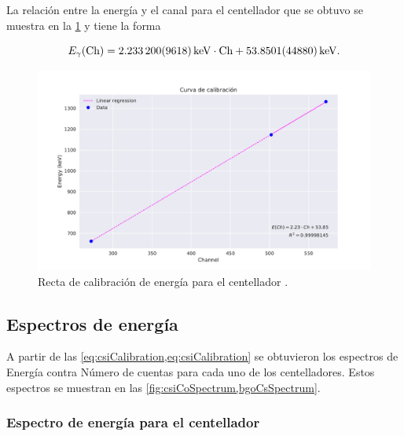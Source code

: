 \documentclass[12pt]{article}
\begin{document}
        La relación entre la energía y el canal para el centellador  que se obtuvo se muestra en la \cref{fig:bgoCalibration} y tiene la forma

        \begin{equation}
            E_{\gamma}(\text{Ch}) = \qty{2.2332 \pm 0.009618}{\keV} \cdot \text{Ch} + \qty{53.8501 \pm 4.4880}{\keV}.
            \label{eq:bgoCalibration}
        \end{equation}

        \begin{figure}[!htb]
            \centering
            \includegraphics[scale = 0.7]{bgo_calibration.pdf}
            \caption{Recta de calibración de energía para el centellador .}
            \label{fig:bgoCalibration}
        \end{figure}

    \subsection*{Espectros de energía}

    A partir de las \cref{eq:csiCalibration,eq:csiCalibration} se obtuvieron los espectros de Energía contra Número de cuentas para cada uno de los centelladores. Estos espectros se muestran en las \cref{fig:csiCoSpectrum,bgoCsSpectrum}.

    \subsubsection*{Espectro de energía para el centellador }
\end{document}

